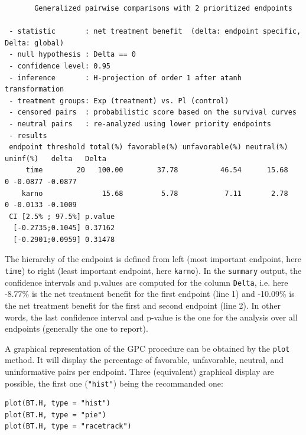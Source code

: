 \documentclass[12pt]{article}
\begin{document}
\begin{verbatim}
       Generalized pairwise comparisons with 2 prioritized endpoints

 - statistic       : net treatment benefit  (delta: endpoint specific, Delta: global) 
 - null hypothesis : Delta == 0 
 - confidence level: 0.95 
 - inference       : H-projection of order 1 after atanh transformation 
 - treatment groups: Exp (treatment) vs. Pl (control) 
 - censored pairs  : probabilistic score based on the survival curves
 - neutral pairs   : re-analyzed using lower priority endpoints
 - results
 endpoint threshold total(%) favorable(%) unfavorable(%) neutral(%) uninf(%)   delta   Delta
     time        20   100.00        37.78          46.54      15.68        0 -0.0877 -0.0877
    karno              15.68         5.78           7.11       2.78        0 -0.0133 -0.1009
 CI [2.5% ; 97.5%] p.value 
  [-0.2735;0.1045] 0.37162 
  [-0.2901;0.0959] 0.31478
\end{verbatim}

The hierarchy of the endpoint is defined from left (most important
endpoint, here \texttt{time}) to right (least important endpoint, here
\texttt{karno}). In the \texttt{summary} output, the confidence intervals and
p.values are computed for the column \texttt{Delta}, i.e. here -8.77\% is the
net treatment benefit for the first endpoint (line 1) and -10.09\% is the net
treatment benefit for the first and second endpoint (line 2). In other words,
the last confidence interval and p-value is the one for the analysis
over all endpoints (generally the one to report).

\bigskip

A graphical representation of the GPC procedure can be obtained by the
\texttt{plot} method. It will display the percentage of favorable,
unfavorable, neutral, and uninformative pairs per endpoint. Three
(equivalent) graphical display are possible, the first one (\texttt{"hist"})
being the recommanded one:
\lstset{language=r,label= ,caption= ,captionpos=b,numbers=none}
\begin{lstlisting}
plot(BT.H, type = "hist")
plot(BT.H, type = "pie")
plot(BT.H, type = "racetrack")
\end{lstlisting}
\end{document}
